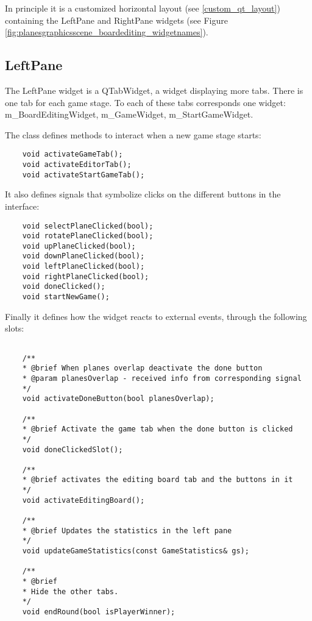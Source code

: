 In principle it is a customized horizontal layout (see \ref{custom_qt_layout}) containing the LeftPane and RightPane widgets (see Figure \ref{fig:planesgraphicsscene_boardediting_widgetnames}). 

\subsection{LeftPane}
The LeftPane widget is a QTabWidget, a widget displaying more tabs. There is one tab for each game stage. To each of these tabs corresponds one widget: m\_BoardEditingWidget, m\_GameWidget, m\_StartGameWidget.

The class defines methods to interact when a new game stage starts:

\begin{lstlisting}
    void activateGameTab();
	void activateEditorTab();
	void activateStartGameTab();
\end{lstlisting}

It also defines signals that symbolize clicks on the different buttons in the interface:

\begin{lstlisting}
    void selectPlaneClicked(bool);
	void rotatePlaneClicked(bool);
	void upPlaneClicked(bool);
	void downPlaneClicked(bool);
	void leftPlaneClicked(bool);
	void rightPlaneClicked(bool);
	void doneClicked();
	void startNewGame();
\end{lstlisting}

Finally it defines how the widget reacts to external events, through the following slots:

\begin{lstlisting}

	/**
	* @brief When planes overlap deactivate the done button
	* @param planesOverlap - received info from corresponding signal
	*/
	void activateDoneButton(bool planesOverlap);
	
	/**
	* @brief Activate the game tab when the done button is clicked
	*/
	void doneClickedSlot();
	
	/**
	* @brief activates the editing board tab and the buttons in it
	*/
	void activateEditingBoard();
	
	/**
	* @brief Updates the statistics in the left pane
	*/
	void updateGameStatistics(const GameStatistics& gs);
	
	/**
	* @brief
	* Hide the other tabs.
	*/
	void endRound(bool isPlayerWinner);

\end{lstlisting}

